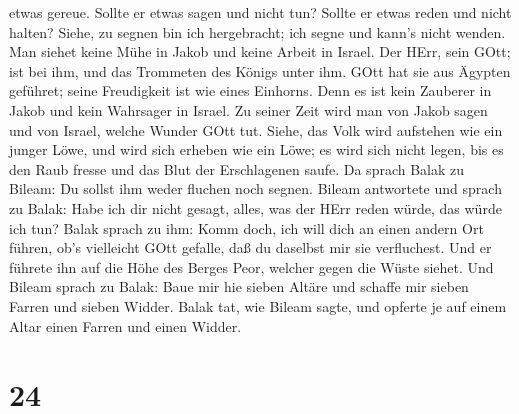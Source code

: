 etwas gereue. Sollte er etwas sagen und nicht tun? Sollte er etwas reden
und nicht halten?  Siehe, zu segnen bin ich hergebracht;
ich segne und kann's nicht wenden.  Man siehet keine Mühe
in Jakob und keine Arbeit in Israel. Der HErr, sein GOtt; ist bei ihm,
und das Trommeten des Königs unter ihm.  GOtt hat sie aus
Ägypten geführet; seine Freudigkeit ist wie eines Einhorns.
 Denn es ist kein Zauberer in Jakob und kein Wahrsager in
Israel. Zu seiner Zeit wird man von Jakob sagen und von Israel, welche
Wunder GOtt tut.  Siehe, das Volk wird aufstehen wie ein
junger Löwe, und wird sich erheben wie ein Löwe; es wird sich nicht
legen, bis es den Raub fresse und das Blut der Erschlagenen saufe.
 Da sprach Balak zu Bileam: Du sollst ihm weder fluchen
noch segnen.  Bileam antwortete und sprach zu Balak: Habe
ich dir nicht gesagt, alles, was der HErr reden würde, das würde ich
tun?  Balak sprach zu ihm: Komm doch, ich will dich an
einen andern Ort führen, ob's vielleicht GOtt gefalle, daß du daselbst
mir sie verfluchest.  Und er führete ihn auf die Höhe des
Berges Peor, welcher gegen die Wüste siehet.  Und Bileam
sprach zu Balak: Baue mir hie sieben Altäre und schaffe mir sieben
Farren und sieben Widder.  Balak tat, wie Bileam sagte, und
opferte je auf einem Altar einen Farren und einen Widder.

\hypertarget{section-23}{%
\section{24}\label{section-23}}

